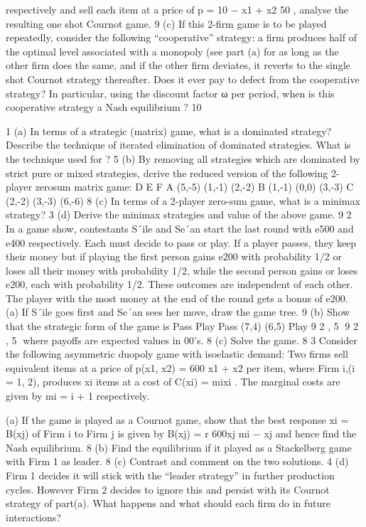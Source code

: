 respectively and sell each item at a price of
p = 10 −
x1 + x2
50 ,
analyse the resulting one shot Cournot game. 9
(c) If this 2-firm game is to be played repeatedly, consider the following
“cooperative” strategy: a firm produces half of the optimal level associated
with a monopoly (see part (a) for as long as the other firm does
the same, and if the other firm deviates, it reverts to the single shot
Cournot strategy thereafter. Does it ever pay to defect from the cooperative
strategy? In particular, using the discount factor ω per period,
when is this cooperative strategy a Nash equilibrium ? 10


1 (a) In terms of a strategic (matrix) game, what is a dominated strategy?
Describe the technique of iterated elimination of dominated strategies.
What is the technique used for ? 5
(b) By removing all strategies which are dominated by strict pure or mixed
strategies, derive the reduced version of the following 2-player zerosum
matrix game:
D E F
A (5,-5) (1,-1) (2,-2)
B (1,-1) (0,0) (3,-3)
C (2,-2) (3,-3) (6,-6)
8
(c) In terms of a 2-player zero-sum game, what is a minimax strategy? 3
(d) Derive the minimax strategies and value of the above game. 9
2 In a game show, contestants S´ile and Se´an start the last round with e500
and e400 respectively. Each must decide to pass or play. If a player passes,
they keep their money but if playing the first person gains e200 with probability
1/2 or loses all their money with probability 1/2, while the second
person gains or loses e200, each with probability 1/2. These outcomes are
independent of each other. The player with the most money at the end of
the round gets a bonus of e200.
(a) If S´ile goes first and Se´an sees her move, draw the game tree. 9
(b) Show that the strategic form of the game is
Pass Play
Pass (7,4) (6,5)
Play
9
2
, 5
9
2
, 5
where payoffs are expected values in 00’s. 8
(c) Solve the game. 8
3 Consider the following asymmetric duopoly game with isoelastic demand:
Two firms sell equivalent items at a price of
p(x1, x2) = 600
x1 + x2
per item, where Firm i,(i = 1, 2), produces xi
items at a cost of
C(xi) = mixi
.
The marginal costs are given by mi = i + 1 respectively.

(a) If the game is played as a Cournot game, show that the best response
xi = B(xj) of Firm i to Firm j is given by
B(xj) = r
600xj
mi
− xj
and hence find the Nash equilibrium. 8
(b) Find the equilibrium if it played as a Stackelberg game with Firm 1 as
leader. 8
(c) Contrast and comment on the two solutions. 4
(d) Firm 1 decides it will stick with the “leader strategy” in further production
cycles. However Firm 2 decides to ignore this and persist with
its Cournot strategy of part(a). What happens and what should each
firm do in future interactions?
